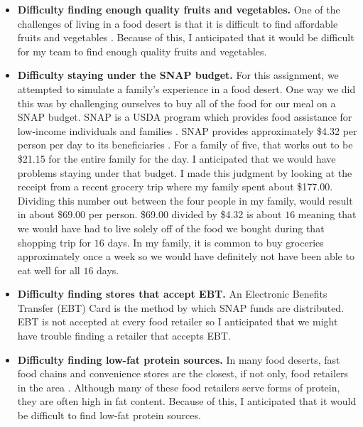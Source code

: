 \documentclass[11pt]{article}
\begin{document}
\begin{itemize}
    \item \textbf{Difficulty finding enough quality fruits and vegetables.} One of the challenges of
        living in a food desert is that it is difficult to find affordable fruits and vegetables
        \cite{cdc}. Because of this, I anticipated that it would be difficult for my team to find
        enough quality fruits and vegetables.

    \item \textbf{Difficulty staying under the SNAP budget.} For this assignment, we attempted to
        simulate a family's experience in a food desert. One way we did this was by challenging
        ourselves to buy all of the food for our meal on a SNAP budget. SNAP is a USDA program which
        provides food assistance for low-income individuals and families \cite{usda}. SNAP provides
        approximately \$4.32 per person per day to its beneficiaries \cite{cbpp}. For a family of
        five, that works out to be \$21.15 for the entire family for the day. I anticipated that we
        would have problems staying under that budget. I made this judgment by looking at the
        receipt from a recent grocery trip where my family spent about \$177.00. Dividing this
        number out between the four people in my family, would result in about \$69.00 per person.
        \$69.00 divided by \$4.32 is about $16$ meaning that we would have had to live solely off
        of the food we bought during that shopping trip for $16$ days. In my family, it is common to
        buy groceries approximately once a week so we would have definitely not have been able to
        eat well for all $16$ days.

    \item \textbf{Difficulty finding stores that accept EBT.} An Electronic Benefits Transfer (EBT)
        Card is the method by which SNAP funds are distributed. EBT is not accepted at every food
        retailer so I anticipated that we might have trouble finding a retailer that accepts EBT.

    \item \textbf{Difficulty finding low-fat protein sources.} In many food deserts, fast food
        chains and convenience stores are the closest, if not only, food retailers in the area
        \cite{gallagher}. Although many of these food retailers serve forms of protein, they are
        often high in fat content. Because of this, I anticipated that it would be difficult to find
        low-fat protein sources.


\end{itemize}
\end{document}
